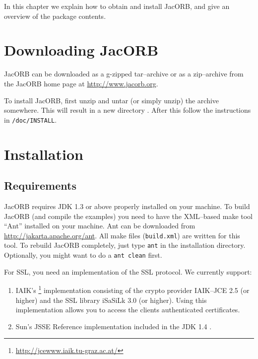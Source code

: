 
In this chapter  we explain how to obtain and  install JacORB, and give
an overview of the package contents.

\section{Downloading JacORB}


JacORB can be downloaded as a g-zipped tar--archive or as a zip--archive
from the  JacORB home page  at
\href{http://www.jacorb.org}{http://www.jacorb.org}.

To install JacORB, first unzip  and untar (or simply unzip) the archive
somewhere.  This will result  in a new directory {\tt \JacORBDir}.
After this follow the instructions in {\tt \JacORBDir/doc/INSTALL}.

\section{Installation}
\label{Sec_installation}

\subsection{Requirements}

JacORB requires JDK 1.3 or above properly installed on your machine.  To build
JacORB (and compile the examples) you need to have the XML--based make tool
``Ant'' installed on your machine.  Ant can be downloaded from
\href{http://jakarta.apache.org/ant}{http://jakarta.apache.org/ant}. All make
files ({\tt build.xml}) are written for this tool. To rebuild JacORB
completely, just type {\tt ant} in the installation directory.  Optionally,
you might want to do a {\tt ant clean} first.

For SSL, you need an implementation of the SSL protocol. We currently support:

\begin{enumerate}
\item IAIK's
  \footnote{\href{http://jcewww.iaik.tu-graz.ac.at}{http://jcewww.iaik.tu-graz.ac.at/}}
  implementation consisting of the crypto provider IAIK--JCE 2.5 (or higher)
  and the SSL library iSaSiLk 3.0 (or higher). Using this implementation
  allows you to access the clients authenticated certificates.
\item Sun's JSSE Reference implementation included in the JDK 1.4 .
\end{enumerate}


